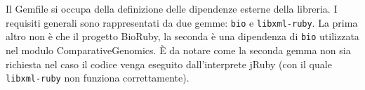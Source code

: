 Il Gemfile si occupa della definizione delle dipendenze esterne della libreria. I requisiti generali sono rappresentati da due gemme: \texttt{bio} e \texttt{libxml-ruby}. La prima altro non è che il progetto BioRuby, la seconda è una dipendenza di \texttt{bio} utilizzata nel modulo ComparativeGenomics. È da notare come la seconda gemma non sia richiesta nel caso il codice venga eseguito dall'interprete jRuby (con il quale \texttt{libxml-ruby} non funziona correttamente).
